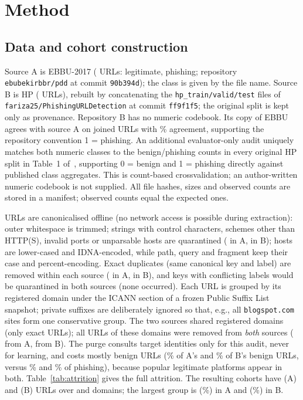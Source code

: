 \section{Method}
\subsection{Data and cohort construction}
Source A is EBBU-2017 ( URLs:  legitimate,  phishing; repository \texttt{ebubekirbbr/pdd} at commit \texttt{90b394d}); the class is given by the file name. Source B is HP ( URLs), rebuilt by concatenating the \texttt{hp\_train/valid/test} files of \texttt{fariza25/PhishingURLDetection} at commit \texttt{ff9f1f5}; the original split is kept only as provenance. Repository B has no numeric codebook. Its copy of EBBU agrees with source A on  joined URLs with \% agreement, supporting the repository convention 1 = phishing. An additional evaluator-only audit uniquely matches both numeric classes to the benign/phishing counts in every original HP split in Table~1 of~\cite{rashid2024}, supporting 0 = benign and 1 = phishing directly against published class aggregates. This is count-based crossvalidation; an author-written numeric codebook is not supplied. All file hashes, sizes and observed counts are stored in a manifest; observed counts equal the expected ones.

URLs are canonicalised offline (no network access is possible during extraction): outer whitespace is trimmed; strings with control characters, schemes other than HTTP(S), invalid ports or unparsable hosts are quarantined ( in A,  in B); hosts are lower-cased and IDNA-encoded, while path, query and fragment keep their case and percent-encoding. Exact duplicates (same canonical key and label) are removed within each source ( in A,  in B), and keys with conflicting labels would be quarantined in both sources (none occurred). Each URL is grouped by its registered domain under the ICANN section of a frozen Public Suffix List snapshot; private suffixes are deliberately ignored so that, e.g., all \texttt{blogspot.com} sites form one conservative group. The two sources shared  registered domains (only  exact URLs); all URLs of these domains were removed from \emph{both} sources ( from A,  from B). The purge consults target identities only for this audit, never for learning, and costs mostly benign URLs (\% of A's and \% of B's benign URLs, versus \% and \% of phishing), because popular legitimate platforms appear in both. Table~\ref{tab:attrition} gives the full attrition. The resulting cohorts have  (A) and  (B) URLs over  and  domains; the largest group is \texttt{} (\%) in A and \texttt{} (\%) in B.

